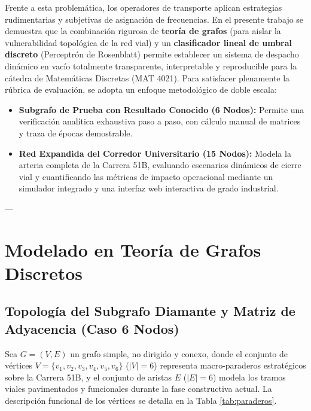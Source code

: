 \documentclass[11pt,letterpaper]{article}
\begin{document}
Frente a esta problemática, los operadores de transporte aplican estrategias rudimentarias y subjetivas de asignación de frecuencias. En el presente trabajo se demuestra que la combinación rigurosa de \textbf{teoría de grafos} (para aislar la vulnerabilidad topológica de la red vial) y un \textbf{clasificador lineal de umbral discreto} (Perceptrón de Rosenblatt) permite establecer un sistema de despacho dinámico en vacío totalmente transparente, interpretable y reproducible para la cátedra de Matemáticas Discretas (MAT 4021). Para satisfacer plenamente la rúbrica de evaluación, se adopta un enfoque metodológico de doble escala:
\begin{itemize}
    \item \textbf{Subgrafo de Prueba con Resultado Conocido (6 Nodos):} Permite una verificación analítica exhaustiva paso a paso, con cálculo manual de matrices y traza de épocas demostrable.
    \item \textbf{Red Expandida del Corredor Universitario (15 Nodos):} Modela la arteria completa de la Carrera 51B, evaluando escenarios dinámicos de cierre vial y cuantificando las métricas de impacto operacional mediante un simulador integrado y una interfaz web interactiva de grado industrial.
\end{itemize}

---

\section{Modelado en Teoría de Grafos Discretos}

\subsection{Topología del Subgrafo Diamante y Matriz de Adyacencia (Caso 6 Nodos)}

Sea $G = (V, E)$ un grafo simple, no dirigido y conexo, donde el conjunto de vértices $V = \{v_1, v_2, v_3, v_4, v_5, v_6\}$ ($|V|=6$) representa macro-paraderos estratégicos sobre la Carrera 51B, y el conjunto de aristas $E$ ($|E|=6$) modela los tramos viales pavimentados y funcionales durante la fase constructiva actual. La descripción funcional de los vértices se detalla en la Tabla \ref{tab:paraderos}.
\end{document}
